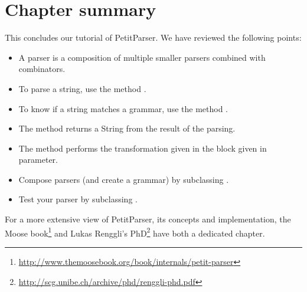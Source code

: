\documentclass[a4paper,10pt,twoside]{book}
\begin{document}
\section{Chapter summary}

This concludes our tutorial of PetitParser. We have reviewed the following points:


\begin{itemize}
\item A parser is a composition of multiple smaller parsers combined with combinators.
\item To parse a string, use the method .
\item To know if a string matches a grammar, use the method .
\item The method  returns a String from the result of the parsing.
\item The method \ct{==>} performs the transformation given in the block given in parameter.
\item Compose parsers (and create a grammar) by subclassing .
\item Test your parser by subclassing .
\end{itemize}


For a more extensive view of PetitParser, its concepts and
implementation, the Moose book\footnote{\url{http://www.themoosebook.org/book/internals/petit-parser}} and Lukas Renggli's
PhD\footnote{\url{http://scg.unibe.ch/archive/phd/renggli-phd.pdf}} have both a dedicated chapter.

\ifx\wholebook\relax\else

\label{cha:glamour}


\end{document}
